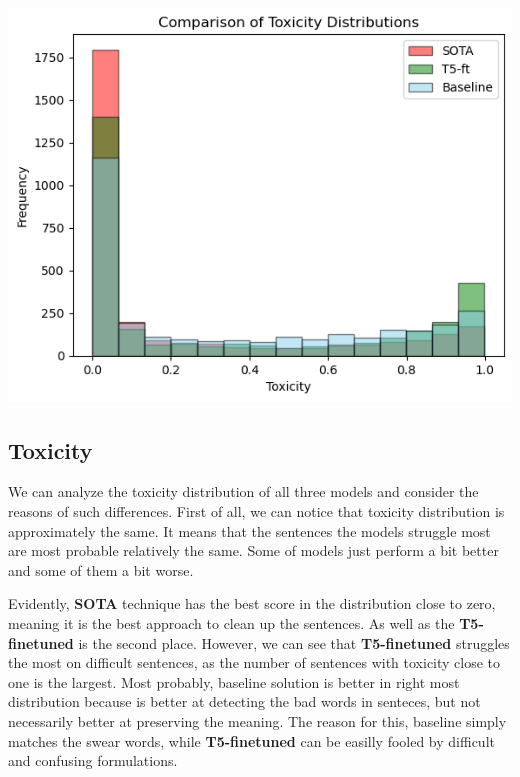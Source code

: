 \begin{multicols*}{2}
\begin{minipage}{\linewidth}
    \includegraphics[scale=0.35]{figures/final/toxicity.png}%
    \label{fig:eval:toxdistr}%
\end{minipage}

\subsection{Toxicity}

We can analyze the toxicity distribution of all three models and consider the
reasons of such differences. First of all, we can notice that toxicity
distribution is approximately the same. It means that the sentences the models
struggle most are most probable relatively the same. Some of models just
perform a bit better and some of them a bit worse.

Evidently, \textbf{SOTA} technique has the best score in the distribution close
to zero, meaning it is the best approach to clean up the sentences. As well as
the \textbf{T5-finetuned} is the second place. However, we can see that
\textbf{T5-finetuned} struggles the most on difficult sentences, as the number
of sentences with toxicity close to one is the largest. Most probably, baseline
solution is better in right most distribution because is better at detecting
the bad words in senteces, but not necessarily better at preserving the
meaning. The reason for this, baseline simply matches the swear words, while
\textbf{T5-finetuned} can be easilly fooled by difficult and confusing
formulations.


\end{multicols*}
